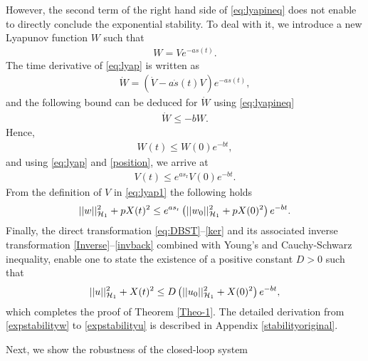 \documentclass[journal]{IEEEtran}
\begin{document}
However, the second term of the right hand side of \eqref{eq:lyapineq} does not enable to directly conclude the exponential stability. To deal with it, we introduce a new Lyapunov function $W$ such that 
\begin{align}\label{eq:lyap}
W=Ve^{-as(t)}.
\end{align}
The time derivative of \eqref{eq:lyap}  is written as 
\begin{align}\label{dotV0}
\dot{W} = \left(\dot{V} -a\dot{s}(t)V\right)e^{-as(t)},
\end{align}
and the following bound  can be deduced for $\dot{W}$ using  \eqref{eq:lyapineq}
\begin{align}\label{dotV}
\dot{W}  \leq -bW.
\end{align}
Hence, 
 \begin{align}
 W(t) \leq W(0) e^{-bt}, 
 \end{align}
  and using \eqref{eq:lyap} and \eqref{position}, we arrive at 
\begin{align}
V (t)\leq e^{as_{{\mathrm r}}} V(0)  e^{-bt}.
\end{align}
From the definition of $V$ in \eqref{eq:lyap1} the following holds
\begin{align}\label{expstabilityw}
||w||_{{\cal H}_1}^2+pX(t)^2 \leq e^{as_{{\mathrm r}}} \left(||w_0||_{{\cal H}_1}^2+pX(0)^2\right) e^{-bt}. 
\end{align}
Finally,  the direct transformation \eqref{eq:DBST}--\eqref{ker} and its associated  inverse transformation \eqref{Inverse}--\eqref{invback} combined with Young's and Cauchy-Schwarz inequality, enable one to state the existence of a positive constant $D>0$ such that 
\begin{align}\label{expstabilityu}
||u||_{{\cal H}_1}^2+X(t)^2 \leq D \left(||u_0||_{{\cal H}_1}^2+X(0)^2\right) e^{-bt},
\end{align}
which completes the proof of Theorem \ref{Theo-1}. The detailed derivation from \eqref{expstabilityw} to \eqref{expstabilityu} is described in Appendix \ref{stabilityoriginal}. 

Next, we show the robustness of the closed-loop system 
\end{document}
